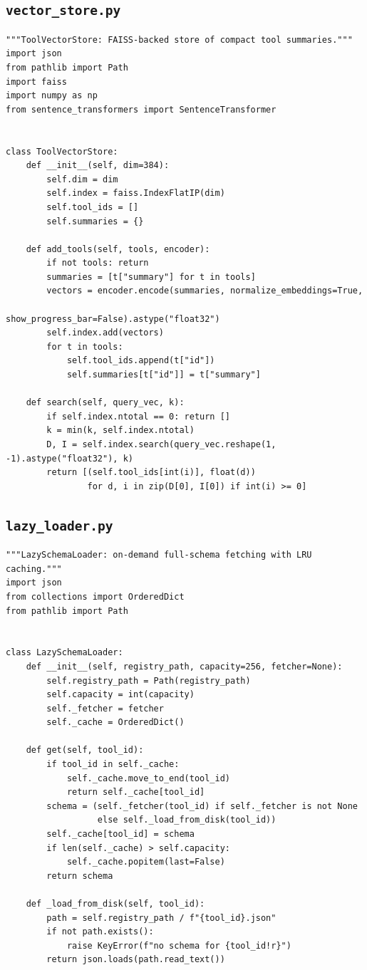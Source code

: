 \documentclass[11pt]{article}
\begin{document}
\subsection{\texttt{vector\_store.py}}
\begin{verbatim}
"""ToolVectorStore: FAISS-backed store of compact tool summaries."""
import json
from pathlib import Path
import faiss
import numpy as np
from sentence_transformers import SentenceTransformer


class ToolVectorStore:
    def __init__(self, dim=384):
        self.dim = dim
        self.index = faiss.IndexFlatIP(dim)
        self.tool_ids = []
        self.summaries = {}

    def add_tools(self, tools, encoder):
        if not tools: return
        summaries = [t["summary"] for t in tools]
        vectors = encoder.encode(summaries, normalize_embeddings=True,
                                 show_progress_bar=False).astype("float32")
        self.index.add(vectors)
        for t in tools:
            self.tool_ids.append(t["id"])
            self.summaries[t["id"]] = t["summary"]

    def search(self, query_vec, k):
        if self.index.ntotal == 0: return []
        k = min(k, self.index.ntotal)
        D, I = self.index.search(query_vec.reshape(1, -1).astype("float32"), k)
        return [(self.tool_ids[int(i)], float(d))
                for d, i in zip(D[0], I[0]) if int(i) >= 0]
\end{verbatim}

\subsection{\texttt{lazy\_loader.py}}
\begin{verbatim}
"""LazySchemaLoader: on-demand full-schema fetching with LRU caching."""
import json
from collections import OrderedDict
from pathlib import Path


class LazySchemaLoader:
    def __init__(self, registry_path, capacity=256, fetcher=None):
        self.registry_path = Path(registry_path)
        self.capacity = int(capacity)
        self._fetcher = fetcher
        self._cache = OrderedDict()

    def get(self, tool_id):
        if tool_id in self._cache:
            self._cache.move_to_end(tool_id)
            return self._cache[tool_id]
        schema = (self._fetcher(tool_id) if self._fetcher is not None
                  else self._load_from_disk(tool_id))
        self._cache[tool_id] = schema
        if len(self._cache) > self.capacity:
            self._cache.popitem(last=False)
        return schema

    def _load_from_disk(self, tool_id):
        path = self.registry_path / f"{tool_id}.json"
        if not path.exists():
            raise KeyError(f"no schema for {tool_id!r}")
        return json.loads(path.read_text())
\end{verbatim}
\end{document}
